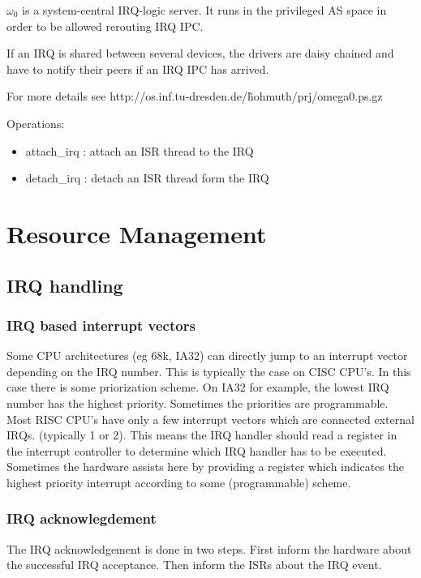 $\omega_0$ is a system-central IRQ-logic server. It runs in the
privileged AS space in order to be allowed rerouting IRQ IPC.

If an IRQ is shared between several devices, the drivers are daisy
chained and have to notify their peers if an IRQ IPC has arrived.

For more details see http://os.inf.tu-dresden.de/\~hohmuth/prj/omega0.ps.gz

Operations:
\begin{itemize}
\item attach\_irq : attach an ISR thread to the IRQ 
\item detach\_irq : detach an ISR thread form the IRQ
\end{itemize}


\section{Resource Management}

\subsection{IRQ handling}

\subsubsection{IRQ based interrupt vectors}

Some CPU architectures (eg 68k, IA32) can directly jump to an
interrupt vector depending on the IRQ number. This is typically the
case on CISC CPU's. In this case there is some priorization scheme. On
IA32 for example, the lowest IRQ number has the highest priority.
Sometimes the priorities are programmable.  Most RISC CPU's have only
a few interrupt vectors which are connected external IRQs. (typically
1 or 2). This means the IRQ handler should read a register in the
interrupt controller to determine which IRQ handler has to be
executed.  Sometimes the hardware assists here by providing a register
which indicates the highest priority interrupt according to some
(programmable) scheme.

\subsubsection{IRQ acknowlegdement}

The IRQ acknowledgement is done in two steps. First inform the
hardware about the successful IRQ acceptance. Then inform the ISRs
about the IRQ event.

